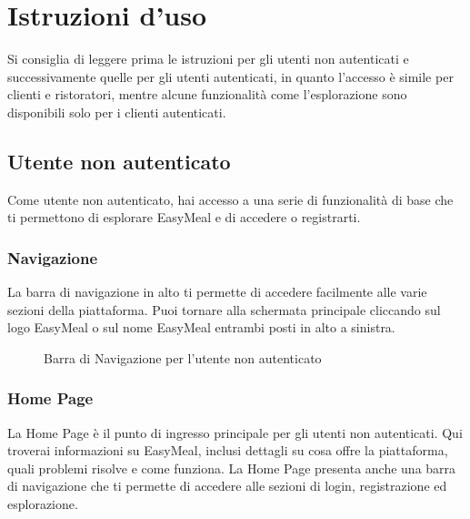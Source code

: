 \section{Istruzioni d'uso}

Si consiglia di leggere prima le istruzioni per gli utenti non autenticati e successivamente quelle per gli utenti autenticati, in quanto l'accesso è simile per clienti e ristoratori, mentre alcune funzionalità come l'esplorazione sono disponibili solo per i clienti autenticati.

\subsection{Utente non autenticato} %
Come utente non autenticato, hai accesso a una serie di funzionalità di base che ti permettono 
di esplorare EasyMeal e di accedere o registrarti.

\subsubsection{Navigazione}
La barra di navigazione in alto ti permette di accedere facilmente alle varie sezioni della piattaforma. 
Puoi tornare alla schermata principale cliccando sul logo EasyMeal o sul nome EasyMeal entrambi posti in alto a sinistra.


\begin{figure}[htbp]
    \centering
    \caption{Barra di Navigazione per l'utente non autenticato}
\end{figure}


\subsubsection{Home Page}
La Home Page è il punto di ingresso principale per gli utenti non autenticati. 
Qui troverai informazioni su EasyMeal, inclusi dettagli su cosa offre la piattaforma, 
quali problemi risolve e come funziona. 
La Home Page presenta anche una barra di navigazione che ti permette di accedere alle sezioni di login, registrazione ed esplorazione.

